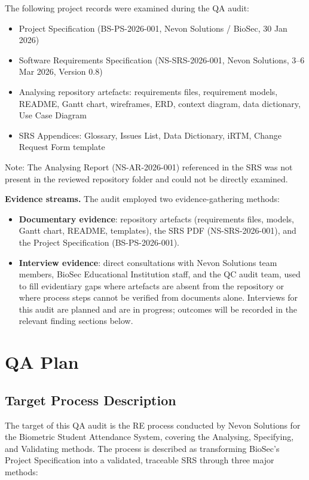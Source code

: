\documentclass[11pt,a4paper]{article}
\begin{document}
The following project records were examined during the QA audit:

\begin{itemize}[leftmargin=*]
\item Project Specification (BS-PS-2026-001, Nevon Solutions / BioSec, 30 Jan 2026)
\item Software Requirements Specification (NS-SRS-2026-001, Nevon Solutions, 3--6 Mar 2026, Version 0.8)
\item Analysing repository artefacts: requirements files, requirement models, README, Gantt chart, wireframes, ERD, context diagram, data dictionary, Use Case Diagram
\item SRS Appendices: Glossary, Issues List, Data Dictionary, iRTM, Change Request Form template
\end{itemize}

Note: The Analysing Report (NS-AR-2026-001) referenced in the SRS was not present in the reviewed repository folder and could not be directly examined.

\medskip
\noindent\textbf{Evidence streams.} The audit employed two evidence-gathering methods:
\begin{itemize}[leftmargin=*]
\item \textbf{Documentary evidence}: repository artefacts (requirements files, models, Gantt chart, README, templates), the SRS PDF (NS-SRS-2026-001), and the Project Specification (BS-PS-2026-001).
\item \textbf{Interview evidence}: direct consultations with Nevon Solutions team members, BioSec Educational Institution staff, and the QC audit team, used to fill evidentiary gaps where artefacts are absent from the repository or where process steps cannot be verified from documents alone. Interviews for this audit are planned and are in progress; outcomes will be recorded in the relevant finding sections below.
\end{itemize}


\section{QA Plan}

\subsection{Target Process Description}

The target of this QA audit is the RE process conducted by Nevon Solutions for the Biometric Student Attendance System, covering the Analysing, Specifying, and Validating methods. The process is described as transforming BioSec's Project Specification into a validated, traceable SRS through three major methods:
\end{document}
